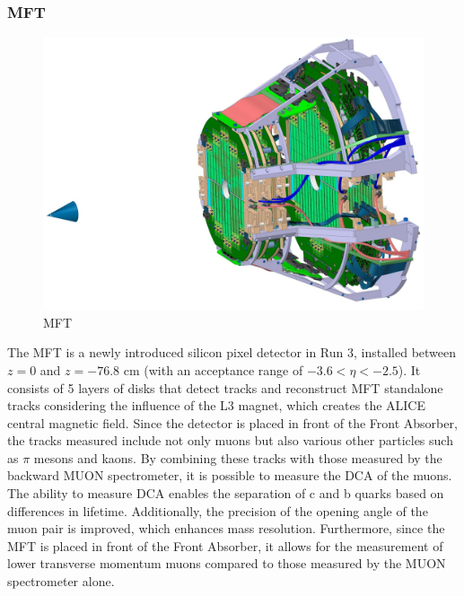         \subsubsection{MFT}
            \begin{figure}[htbp]
                \centering
                \includegraphics[keepaspectratio, scale=0.17]{fig/2_3_MFT.jpg}
                \caption{MFT}
                \label{MFT}
            \end{figure}
            The MFT is a newly introduced silicon pixel detector in Run 3, installed between $z=0$ and $z=-76.8$ cm (with an acceptance range of $-3.6 < \eta < -2.5$). It consists of 5 layers of disks that detect tracks and reconstruct MFT standalone tracks considering the influence of the L3 magnet, which creates the ALICE central magnetic field. Since the detector is placed in front of the Front Absorber, the tracks measured include not only muons but also various other particles such as $\pi$ mesons and kaons. By combining these tracks with those measured by the backward MUON spectrometer, it is possible to measure the DCA of the muons. The ability to measure DCA enables the separation of c and b quarks based on differences in lifetime. Additionally, the precision of the opening angle of the muon pair is improved, which enhances mass resolution. Furthermore, since the MFT is placed in front of the Front Absorber, it allows for the measurement of lower transverse momentum muons compared to those measured by the MUON spectrometer alone.

